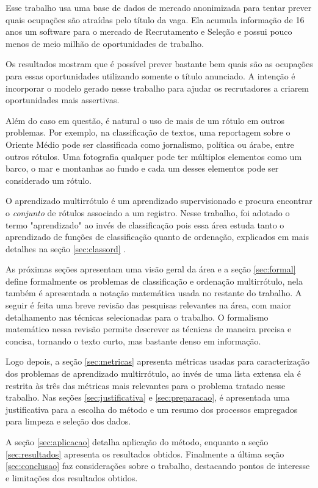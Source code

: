 \documentclass[runningheads,a4paper]{llncs}
\begin{document}
Esse trabalho usa uma base de dados de mercado anonimizada para tentar prever quais ocupações são atraídas pelo título da vaga. Ela acumula informação de 16 anos um software para o mercado de Recrutamento e Seleção e possui pouco menos de meio milhão de oportunidades de trabalho.

Os resultados mostram que é possível prever bastante bem quais são as ocupações para essas oportunidades utilizando somente o título anunciado. A intenção é incorporar o modelo gerado nesse trabalho para ajudar os recrutadores a criarem oportunidades mais assertivas.

Além do caso em questão, é natural o uso de mais de um rótulo em outros problemas. Por exemplo, na classificação de textos, uma reportagem sobre o Oriente Médio pode ser classificada como jornalismo, política ou árabe, entre outros rótulos. Uma fotografia qualquer pode ter múltiplos elementos como um barco, o mar e montanhas ao fundo e cada um desses elementos pode ser considerado um rótulo.

O aprendizado multirrótulo é um aprendizado supervisionado e procura encontrar o \emph{conjunto} de rótulos associado a um registro. Nesse trabalho, foi adotado o termo "aprendizado" ao invés de classificação pois essa área estuda tanto o aprendizado de funções de classificação quanto de ordenação, explicados em mais detalhes na seção \ref{sec:classord} \cite{Zhang2014-be}.

As próximas seções apresentam uma visão geral da área e a seção \ref{sec:formal} define formalmente os problemas de classificação e ordenação multirrótulo, nela também é apresentada a notação matemática usada no restante do trabalho. A seguir é feita uma breve revisão das pesquisas relevantes na área, com maior detalhamento nas técnicas selecionadas para o trabalho. O formalismo matemático nessa revisão permite descrever as técnicas de maneira precisa e concisa, tornando o texto curto, mas bastante denso em informação.

Logo depois, a seção \ref{sec:metricas} apresenta métricas usadas para caracterização dos problemas de aprendizado multirrótulo, ao invés de uma lista extensa ela é restrita às três das métricas mais relevantes para o problema tratado nesse trabalho. Nas seções \ref{sec:justificativa} e \ref{sec:preparacao}, é apresentada uma justificativa para a escolha do método e  um resumo dos processos empregados para limpeza e seleção dos dados.

A seção \ref{sec:aplicacao} detalha aplicação do método, enquanto a seção \ref{sec:resultados} apresenta os resultados obtidos. Finalmente a última seção \ref{sec:conclusao} faz considerações sobre o trabalho, destacando pontos de interesse e limitações dos resultados obtidos.
\end{document}
